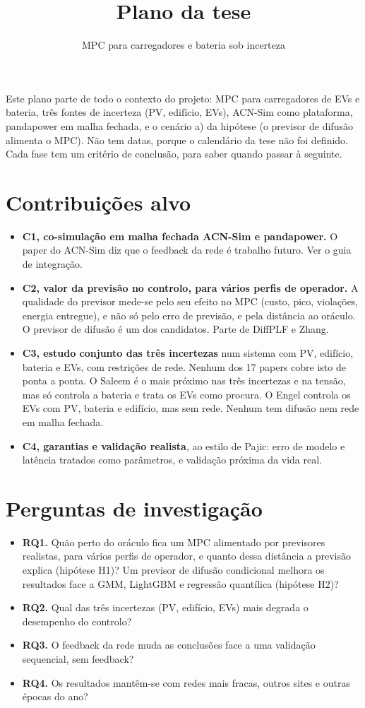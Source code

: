 \documentclass[11pt,a4paper]{article}
\title{Plano da tese}
\author{MPC para carregadores e bateria sob incerteza}
\date{}
\begin{document}
\maketitle

Este plano parte de todo o contexto do projeto: MPC para carregadores de EVs e bateria, três fontes de incerteza (PV, edifício, EVs), ACN-Sim como plataforma, pandapower em malha fechada, e o cenário a) da hipótese (o previsor de difusão alimenta o MPC).
Não tem datas, porque o calendário da tese não foi definido.
Cada fase tem um critério de conclusão, para saber quando passar à seguinte.

\section{Contribuições alvo}

\begin{itemize}
  \item \textbf{C1, co-simulação em malha fechada ACN-Sim e pandapower.} O paper do ACN-Sim diz que o feedback da rede é trabalho futuro. Ver o guia de integração.
  \item \textbf{C2, valor da previsão no controlo, para vários perfis de operador.} A qualidade do previsor mede-se pelo seu efeito no MPC (custo, pico, violações, energia entregue), e não só pelo erro de previsão, e pela distância ao oráculo. O previsor de difusão é um dos candidatos. Parte de DiffPLF e Zhang.
  \item \textbf{C3, estudo conjunto das três incertezas} num sistema com PV, edifício, bateria e EVs, com restrições de rede. Nenhum dos 17 papers cobre isto de ponta a ponta. O Saleem é o mais próximo nas três incertezas e na tensão, mas só controla a bateria e trata os EVs como procura. O Engel controla os EVs com PV, bateria e edifício, mas sem rede. Nenhum tem difusão nem rede em malha fechada.
  \item \textbf{C4, garantias e validação realista}, ao estilo de Pajic: erro de modelo e latência tratados como parâmetros, e validação próxima da vida real.
\end{itemize}

\section{Perguntas de investigação}

\begin{itemize}
  \item \textbf{RQ1.} Quão perto do oráculo fica um MPC alimentado por previsores realistas, para vários perfis de operador, e quanto dessa distância a previsão explica (hipótese H1)? Um previsor de difusão condicional melhora os resultados face a GMM, LightGBM e regressão quantílica (hipótese H2)?
  \item \textbf{RQ2.} Qual das três incertezas (PV, edifício, EVs) mais degrada o desempenho do controlo?
  \item \textbf{RQ3.} O feedback da rede muda as conclusões face a uma validação sequencial, sem feedback?
  \item \textbf{RQ4.} Os resultados mantêm-se com redes mais fracas, outros sites e outras épocas do ano?
\end{itemize}
\end{document}
